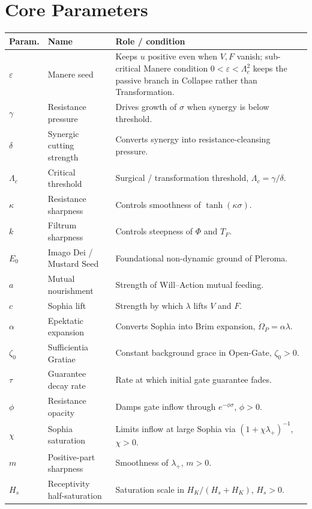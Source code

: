 \documentclass[11pt,a4paper]{article}
\theoremstyle{plain}
\theoremstyle{definition}
\theoremstyle{remark}
\begin{document}
\section{Core Parameters}
\renewcommand{\arraystretch}{1.2}
\begin{longtable}{@{}>{\raggedright\arraybackslash}p{1.5cm}>{\raggedright\arraybackslash}p{3.5cm}>{\raggedright\arraybackslash}p{9.4cm}@{}}
\hline
\textbf{Param.} & \textbf{Name} & \textbf{Role / condition}\\
\hline
\(\varepsilon\) & Manere seed & Keeps \(u\) positive even when \(V,F\) vanish; sub-critical Manere condition \(0<\varepsilon<\Lambda_c^2\) keeps the passive branch in Collapse rather than Transformation.\\
\(\gamma\) & Resistance pressure & Drives growth of \(\sigma\) when synergy is below threshold.\\
\(\delta\) & Synergic cutting strength & Converts synergy into resistance-cleansing pressure.\\
\(\Lambda_c\) & Critical threshold & Surgical / transformation threshold, \(\Lambda_c=\gamma/\delta\).\\
\(\kappa\) & Resistance sharpness & Controls smoothness of \(\tanh(\kappa\sigma)\).\\
\(k\) & Filtrum sharpness & Controls steepness of \(\Phi\) and \(T_F\).\\
\(E_0\) & Imago Dei / Mustard Seed & Foundational non-dynamic ground of Pleroma.\\
\(a\) & Mutual nourishment & Strength of Will--Action mutual feeding.\\
\(c\) & Sophia lift & Strength by which \(\lambda\) lifts \(V\) and \(F\).\\
\(\alpha\) & Epektatic expansion & Converts Sophia into Brim expansion, \(\dot\Omega_P=\alpha\lambda\).\\
\(\zeta_0\) & Sufficientia Gratiae & Constant background grace in Open-Gate, \(\zeta_0>0\).\\
\(\tau\) & Guarantee decay rate & Rate at which initial gate guarantee fades.\\
\(\phi\) & Resistance opacity & Damps gate inflow through \(e^{-\phi\sigma}\), \(\phi>0\).\\
\(\chi\) & Sophia saturation & Limits inflow at large Sophia via \((1+\chi\lambda_+)^{-1}\), \(\chi>0\).\\
\(m\) & Positive-part sharpness & Smoothness of \(\lambda_+\), \(m>0\).\\
\(H_s\) & Receptivity half-saturation & Saturation scale in \(H_K/(H_s+H_K)\), \(H_s>0\).\\

\end{longtable}
\end{document}
